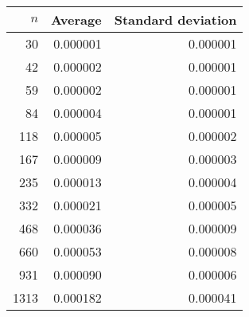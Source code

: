 \begin{tabular}{rrr}
$n$ & Average & Standard deviation\\\hline
30 & 0.000001 & 0.000001\\
42 & 0.000002 & 0.000001\\
59 & 0.000002 & 0.000001\\
84 & 0.000004 & 0.000001\\
118 & 0.000005 & 0.000002\\
167 & 0.000009 & 0.000003\\
235 & 0.000013 & 0.000004\\
332 & 0.000021 & 0.000005\\
468 & 0.000036 & 0.000009\\
660 & 0.000053 & 0.000008\\
931 & 0.000090 & 0.000006\\
1313 & 0.000182 & 0.000041\\
\end{tabular}
